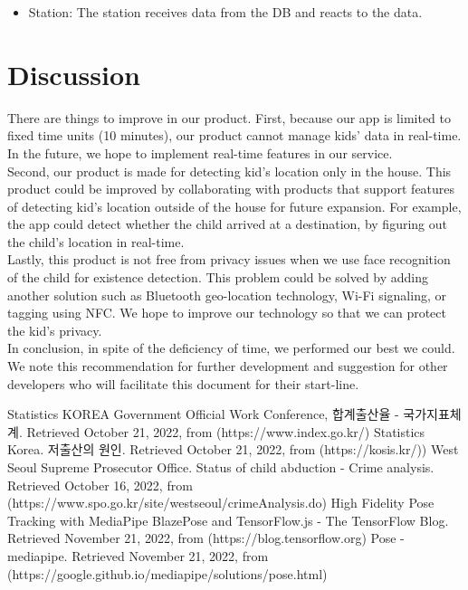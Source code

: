 \documentclass[conference]{IEEEtran}
\begin{document}
\begin{enumerate}[label=\arabic*.]
\begin{enumerate}[label=\arabic*.]
\begin{itemize}
        \item Station: The station receives data from the DB and reacts to the data. \\
    \end{itemize}

\end{enumerate}
\section{\Large{Discussion}} 
There are things to improve in our product. 
First, because our app is limited to fixed time units (10 minutes), our product cannot manage kids’ data in real-time. In the future, we hope to implement real-time features in our service. \\
Second, our product is made for detecting kid’s location only in the house. This product could be improved by collaborating with products that support features of detecting kid’s location outside of the house for future expansion. For example, the app could detect whether the child arrived at a destination, by figuring out the child’s location in real-time. \\
Lastly, this product is not free from privacy issues when we use face recognition of the child for existence detection. This problem could be solved by adding another solution such as Bluetooth geo-location technology, Wi-Fi signaling, or tagging using NFC. We hope to improve our technology so that we can protect the kid’s privacy. \\
In conclusion, in spite of the deficiency of time, we performed our best we could. We note this recommendation for further development and suggestion for other developers who will facilitate this document for their start-line.
\end{enumerate}
\newpage
\begin{thebibliography}{00}
 Statistics KOREA Government Official Work Conference, 합계출산율 - 국가지표체계. Retrieved October 21, 2022, from (https://www.index.go.kr/)
 Statistics Korea. 저출산의 원인. Retrieved October 21, 2022, from (https://kosis.kr/))
 West Seoul Supreme Prosecutor Office. Status of child abduction - Crime analysis. Retrieved October 16, 2022, from (https://www.spo.go.kr/site/westseoul/crimeAnalysis.do)
 High Fidelity Pose Tracking with MediaPipe BlazePose and TensorFlow.js - The TensorFlow Blog. Retrieved November 21, 2022, from 
(https://blog.tensorflow.org)
 Pose - mediapipe. Retrieved November 21, 2022, from 
(https://google.github.io/mediapipe/solutions/pose.html)
\end{thebibliography}
\end{document}
